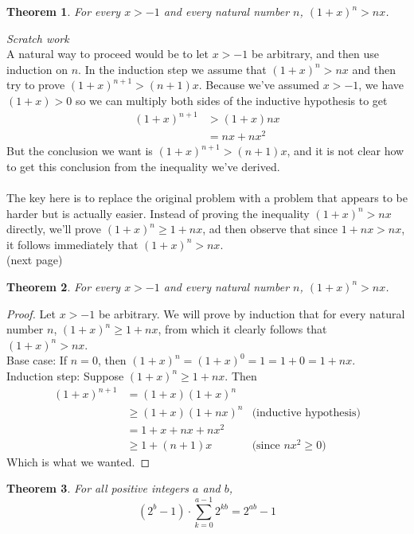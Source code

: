 \documentclass{report}
\newtheorem*{theorem}{Theorem}
\theoremstyle{definition}
\begin{document}
\begin{theorem}
For every $x>-1$ and every natural number $n$, $(1+x)^n>nx$.
\end{theorem}
\noindent\textit{Scratch work}\\
A natural way to proceed would be to let $x>-1$ be arbitrary, and then use induction on $n$. In the induction step we assume that $(1+x)^n>nx$ and then try to prove $(1+x)^{n+1}>(n+1)x$. Because 
we've assumed $x>-1$, we have $(1+x)>0$ so we can multiply both sides of the
inductive hypothesis to get
\begin{align*}
(1+x)^{n+1}&>(1+x)nx\\
&=nx+nx^2
\end{align*}
But the conclusion we want is $(1+x)^{n+1}>(n+1)x$, and it is not clear how to get this conclusion from the inequality we've derived.\\
\vspace{1mm}\\
The key here is to replace the original problem with a problem that appears to be harder but is actually easier. Instead of proving the inequality $(1+x)^n>nx$ directly, we'll
prove $(1+x)^n\geq1+nx$, ad then observe that since $1+nx>nx$, it follows immediately that 
$(1+x)^n>nx$. \\
(next page)\newpage
\begin{theorem}
For every $x>-1$ and every natural number $n$, $(1+x)^n>nx$.
\end{theorem}
\begin{proof}
Let $x>-1$ be arbitrary. We will prove by induction that for every natural number $n$, $(1+x)^n\geq1+nx$, from which it clearly follows that $(1+x)^n>nx$.\\
\indent Base case: If $n=0$, then $(1+x)^n=(1+x)^0=1=1+0=1+nx$.\\
\indent Induction step: Suppose $(1+x)^n\geq1+nx$. Then
\begin{align*}
(1+x)^{n+1}&=(1+x)(1+x)^n\\
&\geq(1+x)(1+nx)^n&\text{(inductive hypothesis)}\\
&=1+x+nx+nx^2\\
&\geq1+(n+1)x&\text{(since $nx^2\geq0$)}
\end{align*}
Which is what we wanted.
\end{proof}
\begin{theorem}
For all positive integers $a$ and $b$,
\begin{equation*}
(2^b-1)\cdot\sum^{a-1}_{k=0}2^{kb}=2^{ab}-1
\end{equation*}
\end{theorem}
\end{document}
